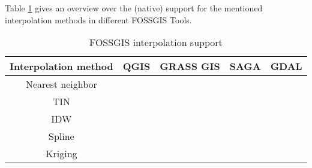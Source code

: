 Table \ref{tab:fossgis_support} gives an overview over the (native) support for the mentioned interpolation methods in different FOSSGIS Tools.

\begin{table}[H!]
	\centering
	\begin{tabular}{c|c|c|c|c}
		Interpolation method & QGIS & GRASS GIS & SAGA & GDAL\\
		\hline
		Nearest neighbor & \xmark &\cmark &\cmark & \cmark \\
		\hline
		TIN & \cmark &\cmark &\cmark & \cmark \\
		\hline
		IDW & \cmark &\cmark &\cmark & \cmark \\
		\hline
		Spline & \xmark &\cmark &\cmark & \xmark \\
		\hline
		Kriging & \xmark &\cmark &\cmark & \xmark \\
	\end{tabular}
	\caption{\label{tab:fossgis_support}FOSSGIS interpolation support}
\end{table}







